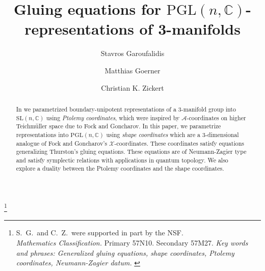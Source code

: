 \documentclass[12pt]{amsart}
\theoremstyle{definition}
\numberwithin{equation}{section}
\def\BC{\mathbb C}
\def\SL{\mathrm{SL}}
\def\PGL{\mathrm{PGL}}
\def\C{\mathbb{C}}
\begin{document}
\begin{abstract}
In \cite{GaroufalidisThurstonZickert} we parametrized boundary-unipotent representations of a 3-manifold group into $\SL(n,\C)$ using \emph{Ptolemy coordinates}, which were inspired by $\mathcal A$-coordinates on higher Teichm\"{u}ller space due to Fock and Goncharov. In this paper, we parametrize representations into $\mathrm{PGL}(n,\C)$ using \emph{shape coordinates} which are a 3-dimensional analogue of Fock and Goncharov's $\mathcal X$-coordinates. These coordinates satisfy equations generalizing Thurston's gluing equations. These equations are of Neumann-Zagier type and satisfy symplectic relations with applications in quantum topology. We also explore a duality between the Ptolemy coordinates and the shape coordinates.
\end{abstract}



\title[Gluing equations for $\PGL(n,\BC)$-representations of 3-manifolds]{
Gluing equations for $\PGL(n,\BC)$-representations of 3-manifolds}
\author{Stavros Garoufalidis}
\address{School of Mathematics \\
         Georgia Institute of Technology \\
         Atlanta, GA 30332-0160, USA \newline
         {\tt \url{http://www.math.gatech.edu/~stavros }}}
\author{Matthias Goerner}
\address{University of Maryland \\
         Department of Mathematics \\
         College Park, MD 20742-4015, USA \newline
         {\tt \url{http://math.berkeley.edu/~matthias/}}}
\author{Christian K. Zickert}
\address{University of Maryland \\
         Department of Mathematics \\
         College Park, MD 20742-4015, USA \newline
         {\tt \url{http://www2.math.umd.edu/~zickert}}}
\thanks{S.~G.~and C.~Z.~were supported in part by the NSF. \\
 {\em Mathematics Classification.} Primary 57N10. Secondary 57M27.
\newline
{\em Key words and phrases: Generalized gluing equations, shape coordinates, Ptolemy coordinates, Neumann-Zagier datum.
}
}
\end{document}
